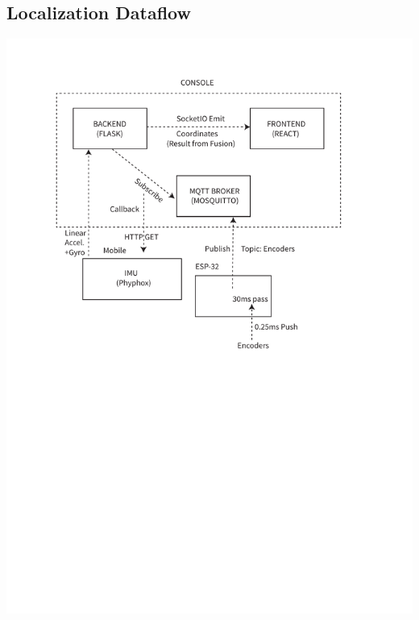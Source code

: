 \documentclass[a4paper,12pt]{article}
\begin{document}
\subsection{Localization Dataflow} \label{locflow}
\includegraphics[trim=40 380 0 57,scale=0.95,clip]{diagrams/loc.pdf}
\end{document}
